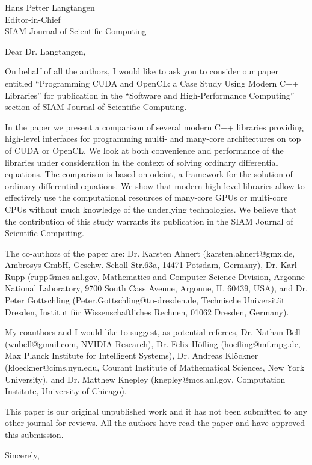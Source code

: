 \documentclass[a4paper,11pt]{letter}
\begin{document}
\begin{letter}{
    Hans Petter Langtangen\\
    Editor-in-Chief\\
    SIAM Journal of Scientific Computing
    }
\opening{Dear Dr. Langtangen,}

On behalf of all the authors, I would like to ask you to consider our paper
entitled ``Programming CUDA and OpenCL: a Case Study Using Modern C++
Libraries'' for publication in the ``Software and High-Performance Computing''
section of SIAM Journal of Scientific Computing.

In the paper we present a comparison of several modern C++ libraries providing
high-level interfaces for programming multi- and many-core architectures on top
of CUDA or OpenCL.  We look at both convenience and performance of the
libraries under consideration in the context of solving ordinary differential
equations. The comparison is based on odeint, a framework for the solution of
ordinary differential equations. We show that modern high-level libraries allow
to effectively use the computational resources of many-core GPUs or multi-core
CPUs without much knowledge of the underlying technologies. We believe that the
contribution of this study warrants its publication in the SIAM Journal of
Scientific Computing.

The co-authors of the paper are: Dr. Karsten Ahnert (karsten.ahnert@gmx.de,
Ambrosys GmbH, Geschw.-Scholl-Str.63a, 14471 Potsdam, Germany), Dr. Karl Rupp
(rupp@mcs.anl.gov, Mathematics and Computer Science Division, Argonne National
Laboratory, 9700 South Cass Avenue, Argonne, IL 60439, USA), and Dr. Peter
Gottschling (Peter.Gottschling@tu-dresden.de, Technische Universit\"at Dresden,
Institut f\"ur Wissenschaftliches Rechnen, 01062 Dresden, Germany).

My coauthors and I would like to suggest, as potential referees, Dr. Nathan
Bell (wnbell@gmail.com, NVIDIA Research), Dr. Felix H\"ofling
(hoefling@mf.mpg.de, Max Planck Institute for Intelligent Systems), Dr. Andreas
Kl\"ockner (kloeckner@cims.nyu.edu, Courant Institute of Mathematical Sciences,
New York University), and Dr. Matthew Knepley (knepley@mcs.anl.gov, Computation
Institute, University of Chicago).

This paper is our original unpublished work and it has not been submitted to
any other journal for reviews. All the authors have read the paper and have
approved this submission.

\closing{Sincerely,}

\end{letter}
\end{document}
